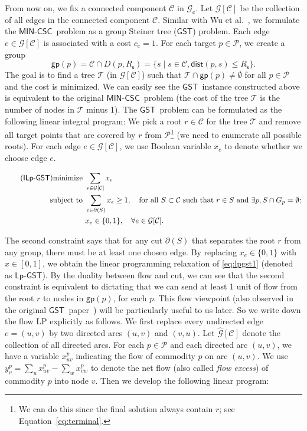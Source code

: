 \documentclass[11pt]{article}
\newcommand{\calC}{{\mathcal C}}
\newcommand{\calT}{{\mathcal T}}
\newcommand{\calP}{{\mathcal P}}
\newcommand{\calG}{{\mathcal G}}
\newcommand{\dist}{\mathsf{dist}}
\newcommand{\mincsc}{$\mathsf{MIN}$-$\mathsf{CSC}$}
\newcommand{\gst}{$\mathsf{GST}$}
\newcommand{\lpr}{\mathsf{Lp}\text{-}\mathsf{GST}}
\newcommand{\group}{\mathsf{gp}}
\newcommand{\Rs}{R_\mathsf{s}}
\newcommand{\Gc}{\mathcal{G}_\mathsf{c}}
\begin{document}
From now on, we fix a connected component $\calC$ in $\Gc$. Let $\calG[\calC]$ be the collection of all edges in the connected component $\calC$.
Similar with Wu et al.~\cite{wu2013approximations},
we formulate the \mincsc\ problem as a group Steiner tree (\gst) problem.
Each edge $e\in \calG[\calC]$ is associated with a cost $c_e=1$.
For each target $p\in \calP$, we create a group
$$\group(p)=\calC\cap D(p, \Rs)=\{s \mid s\in \calC, \dist(p,s)\leq \Rs\}.$$
The goal is to find a tree $\calT$ (in $\calG[\calC]$) such that
$\calT\cap \group(p)\ne \emptyset$ for all $p\in \calP$
and the cost is minimized.
We can easily see the \gst\ instance constructed above is equivalent to
the original \mincsc\ problem
(the cost of the tree $\calT$ is the number of nodes in $\calT$ minus 1).
The \gst\ problem can be formulated as the following linear integral program:
We pick a root $r\in \calC$ for the tree $\calT$ and remove all target points that are covered by $r$ from $\calP$\footnote{We can do this since the final solution always contain $r$; see Equation~\eqref{eq:terminal}.}
(we need to enumerate all possible roots).
For each edge $e\in \calG[\calC]$, we use Boolean variable $x_e$
to denote whether we choose edge $e$.

\begin{align}
\label{eq:lpgst1}
\tag{$\mathsf{ILp}$\text{-}$\mathsf{GST}$}
\mathrm{minimize} \,\, & \sum_{e\in \calG[\calC]}x_e \\
\mathrm{subject\,\, to} \,\, & \sum_{e\in \partial(S)} x_e \geq 1,\quad\text{for all }  S\subset \calC \text{ such that } r\in S \text{ and }\exists p, S\cap G_p=\emptyset; \notag\\
& x_e\in \{0,1\}, \quad \forall e\in \calG[\calC] \notag.
\end{align}

The second constraint says that for any cut $\partial(S)$ that separates the root
$r$ from any group, there must be at least one chosen edge.
By replacing $x_e\in \{0,1\}$ with $x\in [0,1]$, we obtain the linear programming relaxation of \ref{eq:lpgst1} (denoted as $\lpr$).
By the duality between flow and cut, we can see that
the second constraint is equivalent to dictating that
we can send at least 1 unit of flow from the root $r$ to nodes in $\group(p)$, for each $p$.
This flow viewpoint (also observed in the original \gst\ paper~\cite{garg1998polylogarithmic})
will be particularly useful to us later.
So we write down the flow LP explicitly as follows.
We first replace every undirected edge $e=(u,v)$
by two directed arcs $(u,v)$ and $(v,u)$.
Let $\widehat{\calG}[\calC]$ denote the collection of all directed arcs.
For each $p\in \calP$ and
each directed arc $(u,v)$, we have a variable $x^p_{uv}$ indicating the flow of commodity $p$ on arc $(u,v)$.
We use $y^p_v= \sum_{u} x^p_{uv}-\sum_{w}x^p_{vw}$ to denote the net flow
(also called {\em flow excess}) of commodity $p$ into node $v$.
Then we develop the following linear program:
\end{document}
